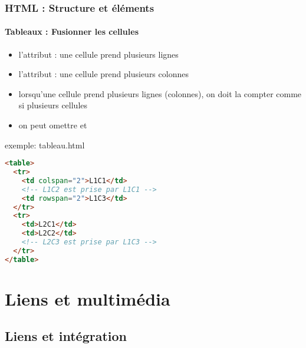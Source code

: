 \documentclass[xcolor=table]{beamer}
\begin{document}
\begin{frame}[fragile]
\frametitle{HTML : Structure et éléments}
\framesubtitle{Tableaux : Fusionner les cellules}

\begin{minipage}{0.50\textwidth} 
	\begin{itemize}
		\item l'attribut  : une cellule prend plusieurs lignes 
		\item l'attribut  : une cellule prend plusieurs colonnes
		\item lorsqu'une cellule prend plusieurs lignes (colonnes), on doit la compter comme si plusieurs cellules
		\item on peut omettre  et 
	\end{itemize}
\end{minipage}
%
\begin{minipage}{0.49\textwidth}
\begin{exampleblock}{exemple: tableau.html}
\lstset{escapeinside=**}
\scriptsize\bfseries\vspace{-6pt}
\begin{lstlisting}[language={html}]
<table>
  <tr>
    <td colspan="2">L1C1</td>
    <!-- L1C2 est prise par L1C1 -->
    <td rowspan="2">L1C3</td>
  </tr>
  <tr>
    <td>L2C1</td>
    <td>L2C2</td>
    <!-- L2C3 est prise par L1C3 -->
  </tr>    
</table>
\end{lstlisting}\vspace{-6pt}
\end{exampleblock}
\end{minipage}

\end{frame}

\section{Liens et multimédia}

\subsection{Liens et intégration}
\end{document}

